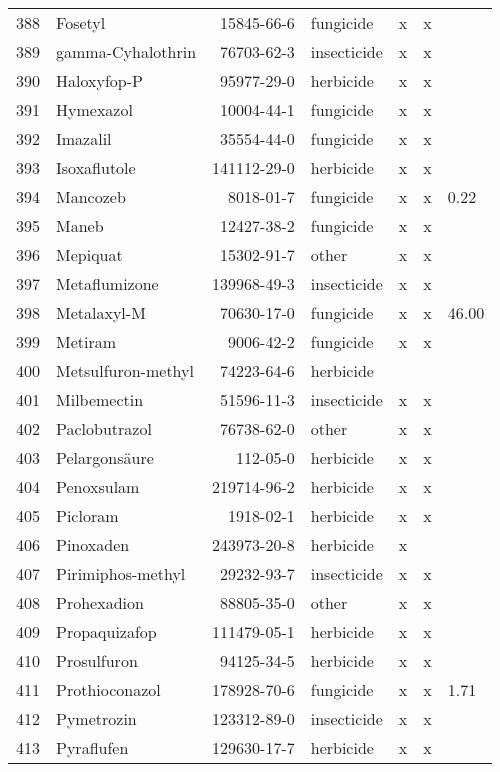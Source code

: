 \begin{longtable}{lp{3cm}rlp{0.5cm}p{0.5cm}p{1cm}}
  388 & Fosetyl & 15845-66-6 & fungicide & x & x &  \\ 
  389 & gamma-Cyhalothrin & 76703-62-3 & insecticide & x & x &  \\ 
  390 & Haloxyfop-P & 95977-29-0 & herbicide & x & x &  \\ 
  391 & Hymexazol & 10004-44-1 & fungicide & x & x &  \\ 
  392 & Imazalil & 35554-44-0 & fungicide & x & x &  \\ 
  393 & Isoxaflutole & 141112-29-0 & herbicide & x & x &  \\ 
  394 & Mancozeb & 8018-01-7 & fungicide & x & x & 0.22 \\ 
  395 & Maneb & 12427-38-2 & fungicide & x & x &  \\ 
  396 & Mepiquat & 15302-91-7 & other & x & x &  \\ 
  397 & Metaflumizone & 139968-49-3 & insecticide & x & x &  \\ 
  398 & Metalaxyl-M & 70630-17-0 & fungicide & x & x & 46.00 \\ 
  399 & Metiram & 9006-42-2 & fungicide & x & x &  \\ 
  400 & Metsulfuron-methyl & 74223-64-6 & herbicide &  &  &  \\ 
  401 & Milbemectin & 51596-11-3 & insecticide & x & x &  \\ 
  402 & Paclobutrazol & 76738-62-0 & other & x & x &  \\ 
  403 & Pelargonsäure & 112-05-0 & herbicide & x & x &  \\ 
  404 & Penoxsulam & 219714-96-2 & herbicide & x & x &  \\ 
  405 & Picloram & 1918-02-1 & herbicide & x & x &  \\ 
  406 & Pinoxaden & 243973-20-8 & herbicide & x &  &  \\ 
  407 & Pirimiphos-methyl & 29232-93-7 & insecticide & x & x &  \\ 
  408 & Prohexadion & 88805-35-0 & other & x & x &  \\ 
  409 & Propaquizafop & 111479-05-1 & herbicide & x & x &  \\ 
  410 & Prosulfuron & 94125-34-5 & herbicide & x & x &  \\ 
  411 & Prothioconazol & 178928-70-6 & fungicide & x & x & 1.71 \\ 
  412 & Pymetrozin & 123312-89-0 & insecticide & x & x &  \\ 
  413 & Pyraflufen & 129630-17-7 & herbicide & x & x &  \\ 

\end{longtable}
